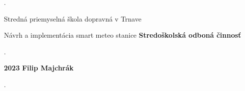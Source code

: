 \begin{titlepage}
    \phantom.
    
    \begin{center}
    {\sc\LARGE Stredná priemyselná škola dopravná v Trnave}
    \medskip
    \break
    \end {center}
    \vspace{6.5cm}
    
    
    \begin{center}
    {\sc\LARGE Návrh a implementácia smart meteo stanice}
    \break
    {\sc\LARGE\bf Stredoškolská odboná činnosť}
    
    \medskip
    \end{center}
    
    
    
    \vspace{5cm}
    
    
    
    \phantom.\hfill
    
    \vfill
    \sc\large \textbf{2023} \hfill\sc\large\textbf{Filip Majchrák}
    
    \phantom.
    \end{titlepage}